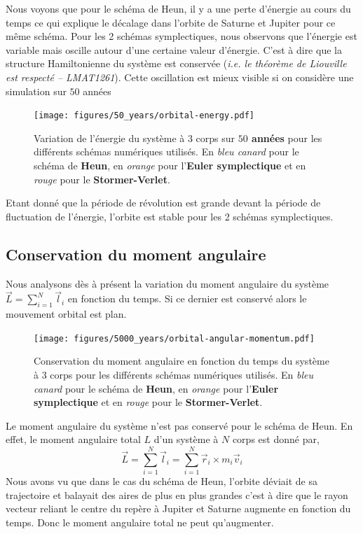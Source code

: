 \documentclass[11pt,twoside=semi,openright,numbers=noenddot]{article}
\begin{document}
Nous voyons que pour le schéma de Heun, il y a une perte d'énergie au cours du temps ce qui explique le décalage dans l'orbite de Saturne et Jupiter pour ce même schéma. Pour les 2 schémas symplectiques, nous observons que l'énergie est variable mais oscille autour d'une certaine valeur d'énergie. C'est à dire que la structure Hamiltonienne du système est conservée (\emph{i.e. le théorème de Liouville est respecté -- LMAT1261}). Cette oscillation est mieux visible si on considère une simulation sur $50$ années

\begin{figure}[H]
  \centering
  \texttt{[image: figures/50\_years/orbital-energy.pdf]}
  \caption{Variation de l'énergie du système à 3 corps sur \textbf{$50$ années} pour les différents schémas numériques utilisés. En \emph{bleu canard} pour le schéma de \textbf{Heun}, en \emph{orange} pour l'\textbf{Euler symplectique} et en \emph{rouge} pour le \textbf{Stormer-Verlet}.}
  \label{fig:orbital-energy--50}
\end{figure}


Etant donné que la période de révolution est grande devant la période de fluctuation de l'énergie, l'orbite est stable pour les 2 schémas symplectiques.

\subsection{Conservation du moment angulaire}
Nous analysons dès à présent la variation du moment angulaire du système $\vec{L} = \sum_{i=1}^{N} \vec{l}_i$ en fonction du temps. Si ce dernier est conservé alors le mouvement orbital est plan.

\begin{figure}[H]
    \centering
    \texttt{[image: figures/5000\_years/orbital-angular-momentum.pdf]}
    \caption{Conservation du moment angulaire en fonction du temps du système à 3 corps pour les différents schémas numériques utilisés. En \emph{bleu canard} pour le schéma de \textbf{Heun}, en \emph{orange} pour l'\textbf{Euler symplectique} et en \emph{rouge} pour le \textbf{Stormer-Verlet}.}
    \label{fig:orbital-angular-momentum}
\end{figure}

Le moment angulaire du système n'est pas conservé pour le schéma de Heun. En effet, le moment angulaire total $L$ d'un système à $N$ corps est donné par,
\begin{equation}
  \vec{L} = \sum_{i=1}^N \vec{l}_i = \sum_{i=1}^N \vec{r}_i \times m_i \vec{v}_i
\end{equation}
Nous avons vu que dans le cas du schéma de Heun, l'orbite déviait de sa trajectoire et balayait des aires de plus en plus grandes c'est à dire que le rayon vecteur reliant le centre du repère à Jupiter et Saturne augmente en fonction du temps. Donc le moment angulaire total ne peut qu'augmenter.
\end{document}
